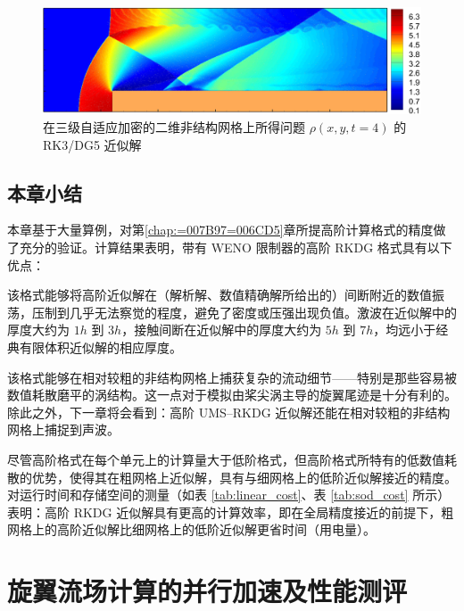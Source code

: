 \begin{figure}[h!]
\begin{centering}
\includegraphics[width=1\textwidth]{figures/forward_step/qiu}
\par\end{centering}
\caption{\label{fig:forward_step_p=00003D5_qiu}在三级自适应加密的二维非结构网格上所得问题
$\rho(x,y,t=4)$ 的 RK3/DG5 近似解}
\end{figure}

\newpage{}

\section{本章小结}

本章基于大量算例，对第\ref{chap:=007B97=006CD5}章所提高阶计算格式的精度做了充分的验证。计算结果表明，带有
WENO 限制器的高阶 RKDG 格式具有以下优点：
\begin{description}[wide]
\item [{基本无振荡}] 该格式能够将高阶近似解在（解析解、数值精确解所给出的）间断附近的数值振荡，压制到几乎无法察觉的程度，避免了密度或压强出现负值。激波在近似解中的厚度大约为
$1h$ 到 $3h$，接触间断在近似解中的厚度大约为 $5h$ 到 $7h$，均远小于经典有限体积近似解的相应厚度。
\item [{数值耗散低}] 该格式能够在相对较粗的非结构网格上捕获复杂的流动细节——特别是那些容易被数值耗散磨平的涡结构。这一点对于模拟由桨尖涡主导的旋翼尾迹是十分有利的。除此之外，下一章将会看到：高阶
UMS–RKDG 近似解还能在相对较粗的非结构网格上捕捉到声波。
\item [{计算效率高}] 尽管高阶格式在每个单元上的计算量大于低阶格式，但高阶格式所特有的低数值耗散的优势，使得其在粗网格上近似解，具有与细网格上的低阶近似解接近的精度。对运行时间和存储空间的测量（如表
\ref{tab:linear_cost}、表 \ref{tab:sod_cost} 所示）表明：高阶 RKDG 近似解具有更高的计算效率，即在全局精度接近的前提下，粗网格上的高阶近似解比细网格上的低阶近似解更省时间（用电量）。
\end{description}
%

\chapter{旋翼流场计算的并行加速及性能测评\label{chap:=005E76=00884C}}


